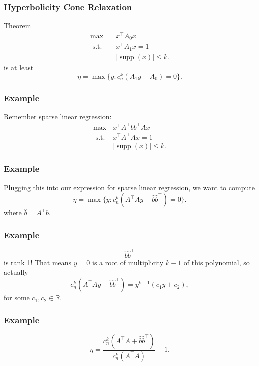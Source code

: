 \documentclass{beamer}
\newcommand{\R}{\mathbb{R}}
\DeclareMathOperator*{\supp}{supp}
\newcommand{\st}{{\text{ s.t. }}}
\begin{document}
\begin{frame}
    \frametitle{Hyperbolicity Cone Relaxation}
\end{frame}
\begin{frame}
    \begin{block}{Theorem}
        \begin{equation}
            \begin{aligned}
                \max\quad & x^{\intercal}A_0x\\
                \st & x^{\intercal}A_1x = 1\\
                    &|\supp(x)| \le k.
            \end{aligned}
        \end{equation}
        is at least 
        \[
            \eta = \max \{y : c_n^k(A_1y-A_0) = 0 \}.
        \]
    \end{block}
\end{frame}
\begin{frame}
    \frametitle{Example}
    Remember sparse linear regression:
    \begin{equation}
        \begin{aligned}
        \max & x^{\intercal}A^{\intercal}bb^{\intercal}Ax\\
        \st & x^{\intercal}A^{\intercal}Ax = 1\\
            & |\supp(x)| \le k.
        \end{aligned}
    \end{equation}
\end{frame}
\begin{frame}
    \frametitle{Example}
    Plugging this into our expression for sparse linear regression, we want to compute
    \[
        \eta = \max \{y : c_n^k(A^{\intercal}Ay-\hat{b}\hat{b}^{\intercal}) = 0 \}.
    \]
    where $\hat{b} = A^{\intercal}b$.
\end{frame}
\begin{frame}
    \frametitle{Example}
    \[
        \hat{b}\hat{b}^{\intercal}
    \]
    is rank 1! That means $y = 0$ is a root of multiplicity $k-1$ of this polynomial, so actually
    \[
        c_n^k(A^{\intercal}Ay-\hat{b}\hat{b}^{\intercal}) = y^{k-1}(c_1y+c_2),
    \]
    for some $c_1,c_2 \in \R$.
\end{frame}
\begin{frame}
    \frametitle{Example}
    \[
        \eta = \frac{c_n^k(A^{\intercal}A+\hat{b}\hat{b}^{\intercal})}{c_n^k(A^{\intercal}A)} - 1.
    \]
\end{frame}
\end{document}
